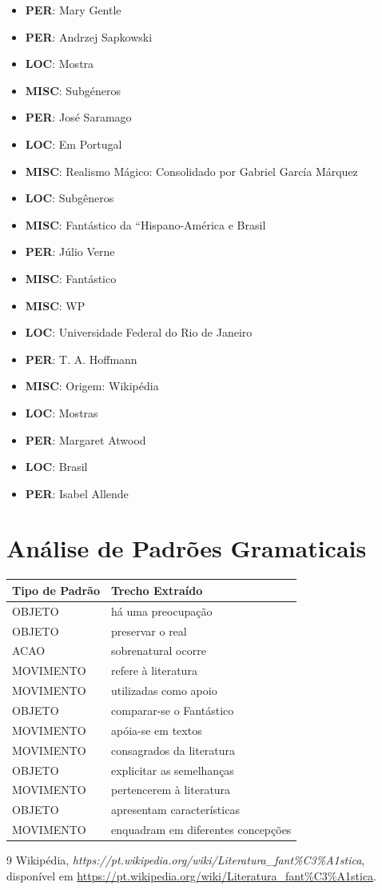 \documentclass{article}
\begin{document}
\begin{itemize}
\item \textbf{PER}: Mary Gentle
\item \textbf{PER}: Andrzej Sapkowski
\item \textbf{LOC}: Mostra
\item \textbf{MISC}: Subgéneros
\item \textbf{PER}: José Saramago
\item \textbf{LOC}: Em Portugal
\item \textbf{MISC}: Realismo Mágico: Consolidado por Gabriel García Márquez
\item \textbf{LOC}: Subgêneros
\item \textbf{MISC}: Fantástico da “Hispano-América e Brasil
\item \textbf{PER}: Júlio Verne
\item \textbf{MISC}: Fantástico
\item \textbf{MISC}: WP
\item \textbf{LOC}: Universidade Federal do Rio de Janeiro
\item \textbf{PER}: T. A. Hoffmann
\item \textbf{MISC}: Origem: Wikipédia
\item \textbf{LOC}: Mostras
\item \textbf{PER}: Margaret Atwood
\item \textbf{LOC}: Brasil
\item \textbf{PER}: Isabel Allende
\end{itemize}
\clearpage

\section{Análise de Padrões Gramaticais}
\begin{table}[h]
\centering
\begin{tabular}{|l|p{8cm}|}
\hline
\textbf{Tipo de Padrão} & \textbf{Trecho Extraído} \\ \hline
OBJETO & há uma preocupação \\ \hline
OBJETO & preservar o real \\ \hline
ACAO & sobrenatural ocorre \\ \hline
MOVIMENTO & refere à literatura \\ \hline
MOVIMENTO & utilizadas como apoio \\ \hline
OBJETO & comparar-se o Fantástico \\ \hline
MOVIMENTO & apóia-se em textos \\ \hline
MOVIMENTO & consagrados da literatura \\ \hline
OBJETO & explicitar as semelhanças \\ \hline
MOVIMENTO & pertencerem à literatura \\ \hline
OBJETO & apresentam características \\ \hline
MOVIMENTO & enquadram em diferentes concepções \\ \hline

\end{tabular}
\end{table}

\clearpage

\begin{thebibliography}{9}
 Wikipédia, \textit{https://pt.wikipedia.org/wiki/Literatura\_fant\%C3\%A1stica}, disponível em \url{https://pt.wikipedia.org/wiki/Literatura_fant%C3%A1stica}.
\end{thebibliography}
\end{document}
